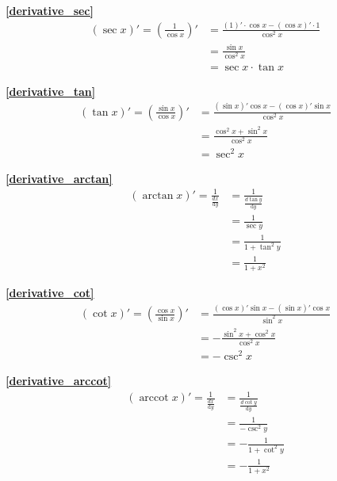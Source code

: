 \textbf{\large \ref{derivative_sec}}
\begin{displaymath}
    \begin{split}
        (\sec x)'=\left(\frac{1}{\cos x}\right)'&=\frac{(1)'\cdot\cos x-(\cos x)'\cdot 1}{\cos^2x}\\
        &=\frac{\sin x}{\cos^2x}\\
        &=\sec x\cdot\tan x
    \end{split}
\end{displaymath}

\textbf{\large \ref{derivative_tan}}
\begin{displaymath}
    \begin{split}
        (\tan x)'=\left(\frac{\sin x}{\cos x}\right)'&=\frac{(\sin x)'\cos x-(\cos x)'\sin x}{\cos^2x}\\
        &=\frac{\cos^2 x+\sin^2 x}{\cos^2x}\\
        &=\sec^2 x
    \end{split}
\end{displaymath}

\textbf{\large \ref{derivative_arctan}}
\begin{displaymath}
    \begin{split}
        (\arctan x)'=\frac{1}{\frac{dx}{\mathrm{d}{y}}}&=\frac{1}{\frac{d\tan y}{\mathrm{d}{y}}}\\
        &=\frac{1}{\sec y}\\
        &=\frac{1}{1+\tan^2 y}\\
        &=\frac{1}{1+x^2}
    \end{split}
\end{displaymath}

\textbf{\large \ref{derivative_cot}}
\begin{displaymath}
    \begin{split}
        (\cot x)'=\left(\frac{\cos x}{\sin x}\right)'&=\frac{(\cos x)'\sin x-(\sin x)'\cos x}{\sin^2x}\\
        &=-\frac{\sin^2 x+\cos^2 x}{\cos^2x}\\
        &=-\csc^2 x
    \end{split}
\end{displaymath}

\textbf{\large \ref{derivative_arccot}}
\begin{displaymath}
    \begin{split}
        (\operatorname{arccot}{x})'=\frac{1}{\frac{dx}{\mathrm{d}{y}}}&=\frac{1}{\frac{d\cot y}{\mathrm{d}{y}}}\\
        &=\frac{1}{-\csc^2 y}\\
        &=-\frac{1}{1+\cot^2 y}\\
        &=-\frac{1}{1+x^2}
    \end{split}
\end{displaymath}

